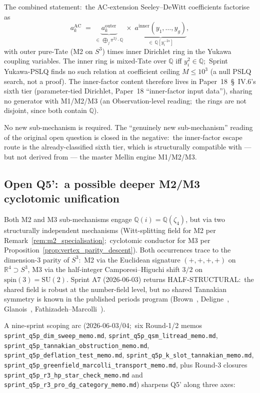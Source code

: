 \documentclass[11pt,a4paper]{article}
\theoremstyle{plain}
\theoremstyle{definition}
\newcommand{\sthree}{S^{3}}
\newcommand{\R}{\mathbb{R}}
\newcommand{\Q}{\mathbb{Q}}
\begin{document}
The combined statement:\ the AC-extension Seeley--DeWitt coefficients
factorise as
\begin{equation}
\label{eq:ac_factorisation}
a_k^{\mathrm{AC}} \;=\; \underbrace{a_k^{\mathrm{outer}}}_{\in\, \bigoplus_j \pi^{2j}\cdot\Q}
\;\times\; \underbrace{a^{\mathrm{inner}}(y_1, \ldots, y_g)}_{\in\, \Q[y_i^{-2s}]},
\end{equation}
with outer pure-Tate (M2 on $\sthree$) times inner Dirichlet ring in the
Yukawa coupling variables.  The inner ring is mixed-Tate over $\Q$
iff $y_i^2 \in \Q$;\ Sprint Yukawa-PSLQ finds no such relation at
coefficient ceiling $M \le 10^3$ (a null PSLQ search, not a proof).  The inner-factor content therefore
lives in Paper~18~\S~IV.6's sixth tier (parameter-tied Dirichlet, Paper~18
``inner-factor input data''), sharing no generator with M1/M2/M3
(an Observation-level reading;\ the rings are not disjoint, since both
contain $\Q$).

No new sub-mechanism is required.  The ``genuinely new sub-mechanism''
reading of the original open question is closed in the negative:\ the
inner-factor escape route is the already-classified sixth tier, which is
structurally compatible with --- but not derived from --- the master
Mellin engine M1/M2/M3.

\subsection{Open Q5':\ a possible deeper M2/M3 cyclotomic unification}
\label{subsec:open_m2_m3}

Both M2 and M3 sub-mechanisms engage $\Q(i) = \Q(\zeta_4)$, but via two
structurally independent mechanisms (Witt-splitting field for M2 per
Remark~\ref{rem:m2_specialisation};\ cyclotomic conductor for M3 per
Proposition~\ref{prop:vertex_parity_descent}).  Both occurrences trace
to the dimension-$3$ parity of $\sthree$:\ M2 via the Euclidean
signature $(+,+,+,+)$ on $\R^4 \supset \sthree$, M3 via the
half-integer Camporesi--Higuchi shift $3/2$ on
$\mathrm{spin}(3) = \mathrm{SU}(2)$.  Sprint A7 (2026-06-03) returns
HALF-STRUCTURAL:\ the shared field is robust at the number-field
level, but no shared Tannakian symmetry is known in the published
periods program (Brown~\cite{brown2012}, Deligne~\cite{deligne2010},
Glanois~\cite{glanois2015}, Fathizadeh--Marcolli~\cite{fathizadeh_marcolli2016}).

A nine-sprint scoping arc (2026-06-03/04;\ six Round-1/2 memos
\texttt{sprint\_q5p\_dim\_sweep\_memo.md},
\texttt{sprint\_q5p\_qsm\_litread\_memo.md},
\texttt{sprint\_q5p\_tannakian\_obstruction\_memo.md},
\texttt{sprint\_q5p\_deflation\_test\_memo.md},
\texttt{sprint\_q5p\_k\_slot\_tannakian\_memo.md},
\texttt{sprint\_q5p\_greenfield\_marcolli\_transport\_memo.md},
plus Round-3 closures
\texttt{sprint\_q5p\_r3\_hp\_star\_check\_memo.md} and
\texttt{sprint\_q5p\_r3\_pro\_dg\_category\_memo.md})
sharpens Q5' along three axes:
\end{document}
